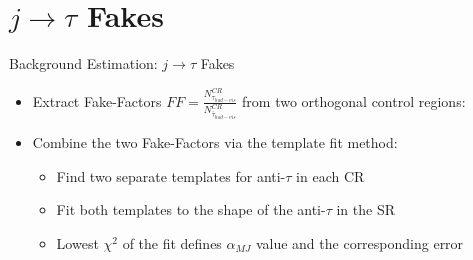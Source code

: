 \documentclass[aspectratio=169,xcolor=table]{beamer}
\begin{document}
  \section{$j \rightarrow \tau$ Fakes}
    \begin{frame}[t]{Background Estimation: $j \rightarrow \tau$ Fakes}
      \begin{itemize}
        \item Extract Fake-Factors $FF = \frac{N^{CR}_{\tau_{had-vis}}}{N^{CR}_{\bar{\tau}_{had-vis}}}$ from two orthogonal control regions:
          \begin{table}
            \tiny
          \end{table}
        \item Combine the two Fake-Factors via the template fit method:
        \begin{itemize}
          \item Find two separate templates for anti-$\tau$ in each CR
          \item Fit both templates to the shape of the anti-$\tau$ in the SR
          \item Lowest $\chi^2$ of the fit defines $\alpha_{MJ}$ value and the corresponding error
        \end{itemize}
      \end{itemize}
          \centering

\end{frame}
\end{document}
